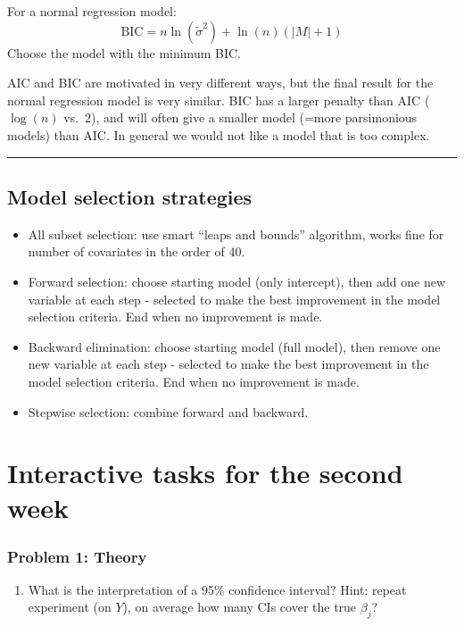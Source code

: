 \documentclass[
]{article}
\providecommand{\tightlist}{%
  \setlength{\itemsep}{0pt}\setlength{\parskip}{0pt}}
\begin{document}
For a normal regression model:
\[ \text{BIC}= n\ln(\tilde{\sigma}^2)+\ln(n)(\lvert M\rvert +1)\] Choose
the model with the minimum BIC.

AIC and BIC are motivated in very different ways, but the final result
for the normal regression model is very similar. BIC has a larger
penalty than AIC (\(\log(n)\) vs.~\(2\)), and will often give a smaller
model (=more parsimonious models) than AIC. In general we would not like
a model that is too complex.

\begin{center}\rule{0.5\linewidth}{0.5pt}\end{center}

\hypertarget{model-selection-strategies}{%
\subsection{Model selection
strategies}\label{model-selection-strategies}}

\begin{itemize}
\item
  All subset selection: use smart ``leaps and bounds'' algorithm, works
  fine for number of covariates in the order of 40.
\item
  Forward selection: choose starting model (only intercept), then add
  one new variable at each step - selected to make the best improvement
  in the model selection criteria. End when no improvement is made.
\item
  Backward elimination: choose starting model (full model), then remove
  one new variable at each step - selected to make the best improvement
  in the model selection criteria. End when no improvement is made.
\item
  Stepwise selection: combine forward and backward.
\end{itemize}

\hypertarget{interactive-tasks-for-the-second-week}{%
\section{Interactive tasks for the second
week}\label{interactive-tasks-for-the-second-week}}

\hypertarget{problem-1-theory}{%
\subsubsection{Problem 1: Theory}\label{problem-1-theory}}

\begin{enumerate}
\def\labelenumi{\arabic{enumi}.}
\tightlist
\item
  What is the interpretation of a 95\% confidence interval? Hint: repeat
  experiment (on \(Y\)), on average how many CIs cover the true
  \(\beta_j\)?
\end{enumerate}
\end{document}
